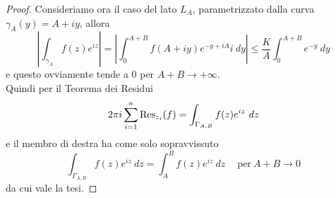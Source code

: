\begin{proof}
    Consideriamo ora il caso del lato $L_A$, parametrizzato dalla curva
    $\gamma_A(y) = A + iy$, allora
    \begin{equation*}
      \left|\int_{\gamma_A} f(z) e^{iz}\right| 
      = \left|\int_{0}^{A+B} f(A+iy)e^{-y + iA}i \ dy \right| 
      \le \frac{K}{A} \int_{0}^{A+B} e^{-y}\ dy
    \end{equation*}
    e questo ovviamente tende a $0$ per $A+B \to +\infty$.\\
    Quindi per il Teorema dei Residui
    \begin{equation*}
      2 \pi i \sum_{i=1}^n \Res_{z_i} (f) = \int_{\Gamma_{A,B}} f(z)e^{iz}\ dz 
    \end{equation*}
    e il membro di destra ha come solo sopravvissuto 
    \begin{equation*}
      \int_{\Gamma_{A,B}} f(z)e^{iz}\ dz = \int_{A}^{B} f(z)e^{iz}\ dz \quad\
      \text{per}\ A+B \to 0
    \end{equation*}
    da cui vale la tesi.
\end{proof}

